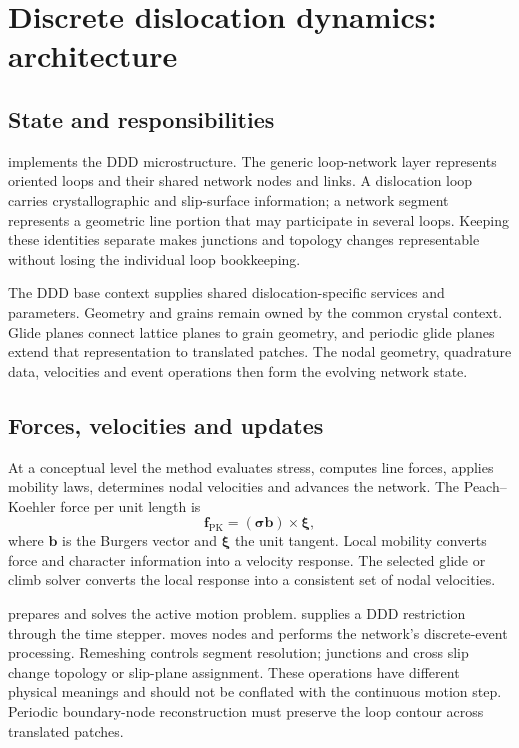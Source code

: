 \chapter{Discrete dislocation dynamics: architecture}\label{chap:ddd}
\section{State and responsibilities}
 implements the DDD microstructure. The generic loop-network layer represents oriented loops and their shared network nodes and links. A dislocation loop carries crystallographic and slip-surface information; a network segment represents a geometric line portion that may participate in several loops. Keeping these identities separate makes junctions and topology changes representable without losing the individual loop bookkeeping.

The DDD base context supplies shared dislocation-specific services and parameters. Geometry and grains remain owned by the common crystal context. Glide planes connect lattice planes to grain geometry, and periodic glide planes extend that representation to translated patches. The nodal geometry, quadrature data, velocities and event operations then form the evolving network state.

\section{Forces, velocities and updates}
At a conceptual level the method evaluates stress, computes line forces, applies mobility laws, determines nodal velocities and advances the network. The Peach--Koehler force per unit length is
\begin{equation}
\bm f_{\mathrm{PK}}=(\bm\sigma\bm b)\times\bm\xi,
\end{equation}
where $\bm b$ is the Burgers vector and $\bm\xi$ the unit tangent. Local mobility converts force and character information into a velocity response. The selected glide or climb solver converts the local response into a consistent set of nodal velocities.

 prepares and solves the active motion problem.  supplies a DDD restriction through the time stepper.  moves nodes and performs the network's discrete-event processing. Remeshing controls segment resolution; junctions and cross slip change topology or slip-plane assignment. These operations have different physical meanings and should not be conflated with the continuous motion step. Periodic boundary-node reconstruction must preserve the loop contour across translated patches.

